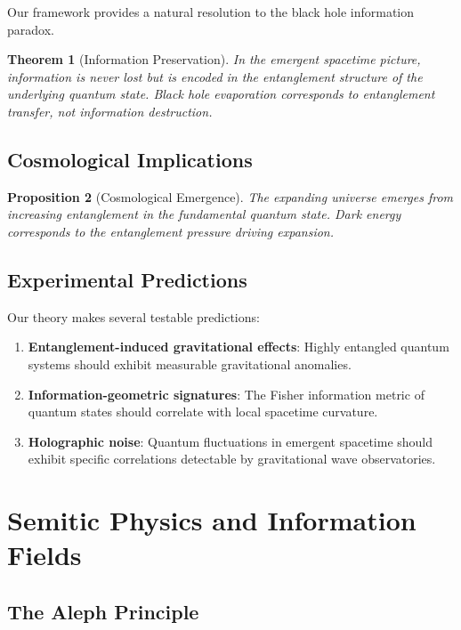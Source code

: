 \documentclass[12pt,a4paper]{article}
\theoremstyle{plain}
\newtheorem{theorem}{Theorem}[section]
\newtheorem{proposition}[theorem]{Proposition}
\theoremstyle{definition}
\theoremstyle{remark}
\begin{document}
Our framework provides a natural resolution to the black hole information paradox.

\begin{theorem}[Information Preservation]
In the emergent spacetime picture, information is never lost but is encoded in the entanglement structure of the underlying quantum state. Black hole evaporation corresponds to entanglement transfer, not information destruction.
\end{theorem}

\subsection{Cosmological Implications}

\begin{proposition}[Cosmological Emergence]
The expanding universe emerges from increasing entanglement in the fundamental quantum state. Dark energy corresponds to the entanglement pressure driving expansion.
\end{proposition}

\subsection{Experimental Predictions}

Our theory makes several testable predictions:

\begin{enumerate}
\item \textbf{Entanglement-induced gravitational effects}: Highly entangled quantum systems should exhibit measurable gravitational anomalies.
\item \textbf{Information-geometric signatures}: The Fisher information metric of quantum states should correlate with local spacetime curvature.
\item \textbf{Holographic noise}: Quantum fluctuations in emergent spacetime should exhibit specific correlations detectable by gravitational wave observatories.
\end{enumerate}

\section{Semitic Physics and Information Fields}

\subsection{The Aleph Principle}
\end{document}
